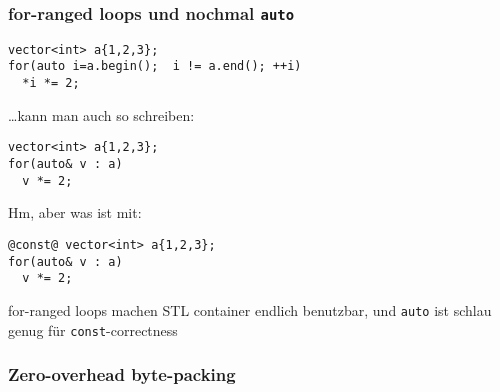 \documentclass[t,ngerman]{beamer}
\begin{document}
\begin{frame}[fragile]
  \frametitle{for-ranged loops und nochmal \lstinline!auto!}
\begin{lstlisting}
vector<int> a{1,2,3};
for(auto i=a.begin();  i != a.end(); ++i)
  *i *= 2;
\end{lstlisting}

\pause
\ldots{}kann man auch so schreiben:
\begin{lstlisting}
vector<int> a{1,2,3};
for(auto& v : a)
  v *= 2;
\end{lstlisting}

\pause
Hm, aber was ist mit:
\begin{lstlisting}
@const@ vector<int> a{1,2,3};
for(auto& v : a)
  v *= 2;
\end{lstlisting}

\pause
\begin{block}{}
  \centering
  for-ranged loops machen STL container endlich benutzbar,
  und \lstinline!auto! ist schlau genug für \lstinline!const!-correctness
\end{block}
  
\end{frame}

\begin{frame}
  \frametitle{Zero-overhead byte-packing}
\end{frame}
\end{document}
